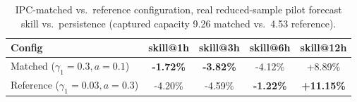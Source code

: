 \begin{table}[t]
\centering\footnotesize
\begin{tabular}{lcccc}
\toprule
Config & skill@1h & skill@3h & skill@6h & skill@12h \\
\midrule
Matched ($\gamma_1{=}0.3, a{=}0.1$) & \textbf{-1.72\%} & \textbf{-3.82\%} & -4.12\% & +8.89\% \\
Reference ($\gamma_1{=}0.03, a{=}0.3$) & -4.20\% & -4.59\% & \textbf{-1.22\%} & \textbf{+11.15\%} \\
\bottomrule
\end{tabular}
\caption{IPC-matched vs.\ reference configuration, real reduced-sample pilot forecast skill vs.\ persistence (captured capacity 9.26 matched vs.\ 4.53 reference).}
\label{tab:matching}
\end{table}
